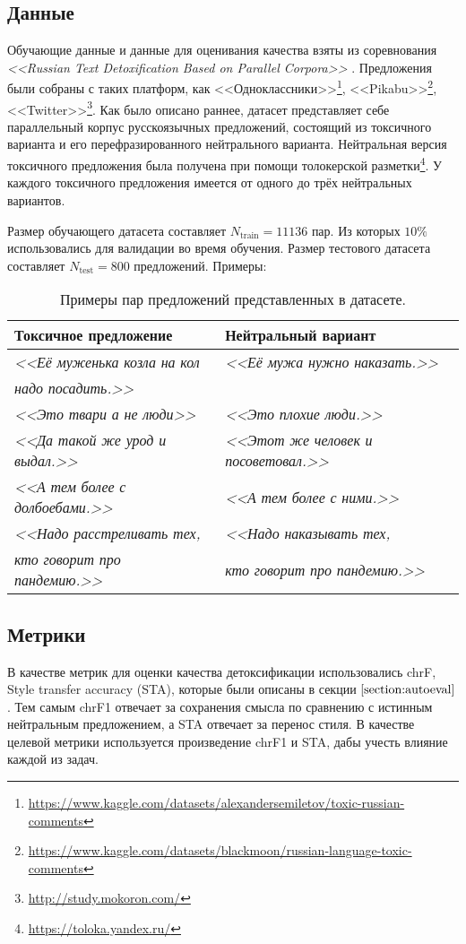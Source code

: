 \subsection{Данные}
Обучающие данные и данные для оценивания качества взяты из соревнования \textit{<<Russian Text Detoxification Based on Parallel Corpora>>} \cite{russe_data}.
Предложения были собраны с таких платформ, как 
<<Одноклассники>>\footnote{\url{https://www.kaggle.com/datasets/alexandersemiletov/toxic-russian-comments}}, 
<<Pikabu>>\footnote{\url{https://www.kaggle.com/datasets/blackmoon/russian-language-toxic-comments}}, 
<<Twitter>>\footnote{\url{http://study.mokoron.com/}}.
Как было описано раннее, датасет представляет себе параллельный корпус русскоязычных предложений, состоящий из токсичного варианта и его перефразированного нейтрального варианта. 
Нейтральная версия токсичного предложения была получена при помощи толокерской разметки\footnote{\url{https://toloka.yandex.ru/}}. 
У каждого токсичного предложения имеется от одного до трёх нейтральных вариантов. 

Размер обучающего датасета составляет $N_{\text{train}} = 11136$ пар.
Из которых $10\%$ использовались для валидации во время обучения.
Размер тестового датасета составляет $N_{\text{test}} = 800$ предложений.
Примеры: 
\begin{table}[ht]
\centering
 \begin{tabular}{|l|l|} 
 \hline
 Токсичное предложение & Нейтральный вариант \\ [0.5ex] 
 \hline
 \textit{<<Её муженька козла на кол} & \textit{<<Её мужа нужно наказать.>>} \\
 \textit{ надо посадить.>>} &  \\
 \textit{<<Это твари а не люди>>} & \textit{<<Это плохие люди.>>} \\
 \textit{<<Да такой же урод и выдал.>>} & \textit{<<Этот же человек и посоветовал.>>} \\
 \textit{<<А тем более с долбоебами.>>} & \textit{<<А тем более с ними.>>} \\
 \textit{<<Надо расстреливать тех,} & \textit{<<Надо наказывать тех,} \\
 \textit{ кто говорит про пандемию.>>} & \textit{ кто говорит про пандемию.>>} \\
 \hline
 \end{tabular}
 \caption{Примеры пар предложений представленных в датасете.}
 \label{table:dataset_examples}
\end{table}

\subsection{Метрики}
В качестве метрик для оценки качества детоксификации использовались chrF\cite{popovic-2015-chrf}, Style transfer accuracy (STA), которые были описаны в секции $\ref{section:autoeval}$. 
Тем самым chrF1 отвечает за сохранения смысла по сравнению с истинным нейтральным предложением, а STA отвечает за перенос стиля. 
В качестве целевой метрики используется произведение chrF1 и STA, дабы учесть влияние каждой из задач.

